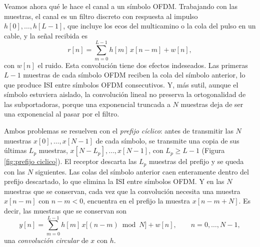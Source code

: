 Veamos ahora qué le hace el canal a un símbolo OFDM. Trabajando con las muestras, el canal es un filtro discreto con respuesta al impulso $h[0],\ldots,h[L-1]$, que incluye los ecos del multicamino o la cola del pulso en un cable, y la señal recibida es
\begin{equation*}
    r[n] = \sum_{m=0}^{L-1} h[m]\,x[n-m] + w[n],
\end{equation*}
con $w[n]$ el ruido. Esta convolución tiene dos efectos indeseados. Las primeras $L-1$ muestras de cada símbolo OFDM reciben la cola del símbolo anterior, lo que produce ISI entre símbolos OFDM consecutivos. Y, más sutil, aunque el símbolo estuviera aislado, la convolución lineal no preserva la ortogonalidad de las subportadoras, porque una exponencial truncada a $N$ muestras deja de ser una exponencial al pasar por el filtro.

Ambos problemas se resuelven con el \emph{prefijo cíclico}: antes de transmitir las $N$ muestras $x[0],\ldots,x[N-1]$ de cada símbolo, se transmite una copia de sus últimas $L_p$ muestras, $x[N-L_p],\ldots,x[N-1]$, con $L_p\geqslant L-1$ (Figura \ref{fig:prefijo ciclico}). El receptor descarta las $L_p$ muestras del prefijo y se queda con las $N$ siguientes. Las colas del símbolo anterior caen enteramente dentro del prefijo descartado, lo que elimina la ISI entre símbolos OFDM. Y en las $N$ muestras que se conservan, cada vez que la convolución necesita una muestra $x[n-m]$ con $n-m<0$, encuentra en el prefijo la muestra $x[n-m+N]$. Es decir, las muestras que se conservan son
\begin{equation}\label{eq:convolucion circular}
    y[n] = \sum_{m=0}^{L-1} h[m]\,x\big[(n-m)\bmod N\big] + w[n], \qquad n=0,\ldots,N-1,
\end{equation}
una \emph{convolución circular} de $x$ con $h$.

